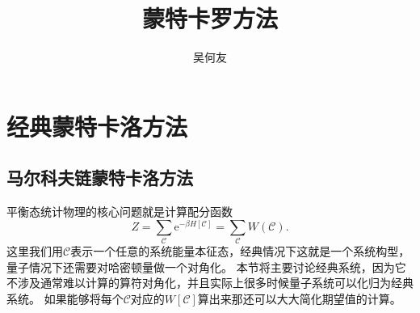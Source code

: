 \documentclass[hyperref, UTF8, a4paper]{ctexart}
\title{蒙特卡罗方法}
\author{吴何友}
\newcommand*{\ee}{\mathrm{e}}
\begin{document}
\maketitle

\section{经典蒙特卡洛方法}

\subsection{马尔科夫链蒙特卡洛方法}\label{sec:mcmc-method}

平衡态统计物理的核心问题就是计算配分函数
\begin{equation}
    Z = \sum_\mathcal{C} \ee^{-\beta H[\mathcal{C}]} = \sum_\mathcal{C} W(\mathcal{C}).
    \label{eq:partition-function}
\end{equation}
这里我们用$\mathcal{C}$表示一个任意的系统能量本征态，经典情况下这就是一个系统构型，量子情况下还需要对哈密顿量做一个对角化。
本节将主要讨论经典系统，因为它不涉及通常难以计算的算符对角化，并且实际上很多时候量子系统可以化归为经典系统。
如果能够将每个$\mathcal{C}$对应的$W[\mathcal{C}]$算出来那还可以大大简化期望值的计算。
\end{document}
